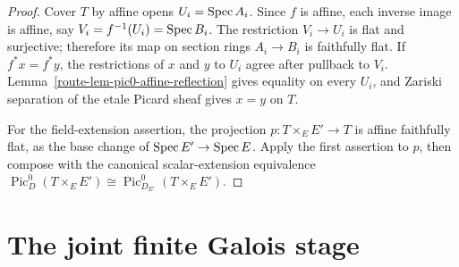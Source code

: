 \begin{proof}
  Cover \(T\) by affine opens \(U_i=\operatorname{Spec} A_i\). Since \(f\) is
  affine, each inverse image is affine, say
  \(V_i=f^{-1}(U_i)=\operatorname{Spec} B_i\). The restriction \(V_i\to U_i\) is
  flat and surjective; therefore its map on section rings
  \(A_i\to B_i\) is faithfully flat. If \(f^*x=f^*y\), the
  restrictions of \(x\) and \(y\) to \(U_i\) agree after pullback
  to \(V_i\). Lemma~\ref{route-lem-pic0-affine-reflection} gives
  equality on every \(U_i\), and Zariski separation of the etale
  Picard sheaf gives \(x=y\) on \(T\).

  For the field-extension assertion, the projection
  \(p:T\times_E E'\to T\) is affine faithfully flat, as the base
  change of \(\operatorname{Spec} E'\to\operatorname{Spec} E\). Apply the first assertion to
  \(p\), then compose with the canonical scalar-extension equivalence
  \(\operatorname{Pic}^0_D(T\times_E E')\cong
    \operatorname{Pic}^0_{D_{E'}}(T\times_E E')\).
\end{proof}

\section{The joint finite Galois stage}

